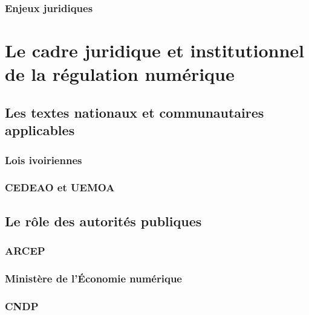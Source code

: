 
\subsection{Enjeux juridiques}


\chapter{Le cadre juridique et institutionnel de la régulation numérique}

\section{Les textes nationaux et communautaires applicables}

\subsection{Lois ivoiriennes}


\subsection{CEDEAO et UEMOA}


\section{Le rôle des autorités publiques}

\subsection{ARCEP}


\subsection{Ministère de l'Économie numérique}


\subsection{CNDP}

